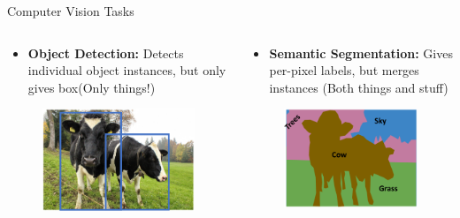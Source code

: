 \documentclass[10pt]{beamer}
\theoremstyle{remark}
\theoremstyle{definition}
\begin{document}
\begin{frame}{Computer Vision Tasks}
\begin{columns}
    \begin{column}{0.5\textwidth}
        \begin{itemize}
            \item \textbf{Object Detection:} Detects individual object instances, but only gives box(Only things!)
        \end{itemize}
        \begin{figure}
        \centering
        \includegraphics[width=1.0\textwidth,height=1.0\textheight,keepaspectratio]{./images/ins_2.png}
        \end{figure}
    \end{column}
    \begin{column}{0.5\textwidth}
        \begin{itemize}
            \item \textbf{Semantic Segmentation:} Gives per-pixel labels, but merges instances (Both things and stuff)
        \end{itemize}
        \begin{figure}
        \centering
        \includegraphics[width=1.0\textwidth,height=1.0\textheight,keepaspectratio]{./images/ins_3.png}
        \end{figure}
    \end{column}
\end{columns}
    

\end{frame}
\end{document}
